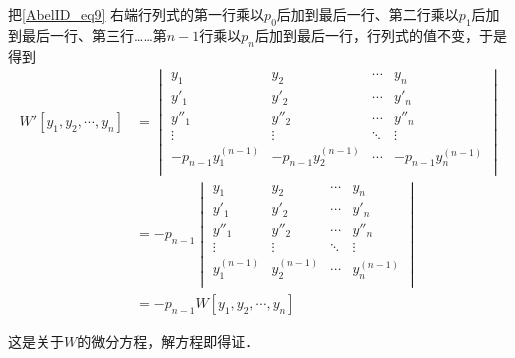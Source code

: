把\autoref{AbelID_eq9}  右端行列式的第一行乘以$p_0$后加到最后一行、第二行乘以$p_1$后加到最后一行、第三行……第$n-1$行乘以$p_n$后加到最后一行，行列式的值不变，于是得到
\begin{equation}\label{AbelID_eq10}
\begin{aligned}
W'[y_1, y_2, \cdots, y_n] &= 
\begin{vmatrix}
y_1&y_2&\cdots&y_n\\
y'_1&y'_2&\cdots&y'_n\\
y''_1&y''_2&\cdots&y''_n\\
\vdots&\vdots&\ddots&\vdots\\
-p_{n-1}y_1^{(n-1)}&-p_{n-1}y_2^{(n-1)}&\cdots&-p_{n-1}y_n^{(n-1)}\\
\end{vmatrix}\\
&=-p_{n-1}
\begin{vmatrix}
y_1&y_2&\cdots&y_n\\
y'_1&y'_2&\cdots&y'_n\\
y''_1&y''_2&\cdots&y''_n\\
\vdots&\vdots&\ddots&\vdots\\
y_1^{(n-1)}&y_2^{(n-1)}&\cdots&y_n^{(n-1)}\\
\end{vmatrix}\\
&= -p_{n-1}W[y_1, y_2, \cdots, y_n]
\end{aligned}
\end{equation}

这是关于$W$的微分方程，解方程即得证．















